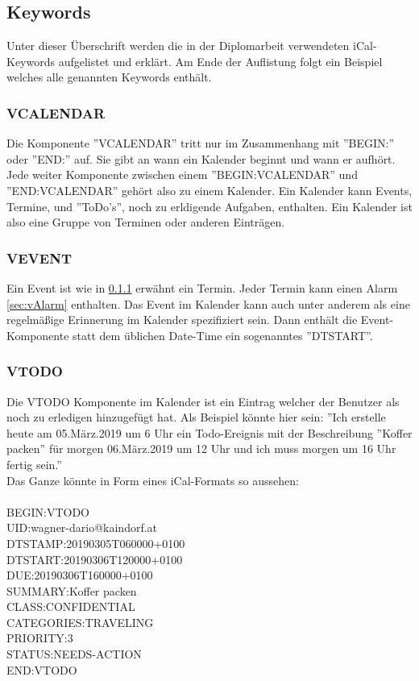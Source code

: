 \subsection{Keywords}
\label{sec:keywords}
Unter dieser Überschrift werden die in der Diplomarbeit verwendeten iCal-Keywords aufgelistet und erklärt. Am Ende der Auflistung folgt ein Beispiel welches alle genannten Keywords enthält. 
\subsubsection{VCALENDAR}
\label{sec:vCalendar} 
Die Komponente ''VCALENDAR'' tritt nur im Zusammenhang mit ''BEGIN:'' oder ''END:'' auf. Sie gibt an wann ein Kalender beginnt und wann er aufhört. Jede weiter Komponente zwischen einem ''BEGIN:VCALENDAR'' und ''END:VCALENDAR'' gehört also zu einem Kalender. Ein Kalender kann Events, Termine, und ''ToDo's'', noch zu erldigende Aufgaben, enthalten. Ein Kalender ist also eine Gruppe von Terminen oder anderen Einträgen. 
\subsubsection{VEVENT}
\label{sec:vEvent} 
Ein Event ist wie in \ref{sec:vCalendar} erwähnt ein Termin. Jeder Termin kann einen Alarm \ref{sec:vAlarm} enthalten. Das Event im Kalender kann auch unter anderem als eine regelmäßige Erinnerung im Kalender spezifiziert sein. Dann enthält die Event-Komponente statt dem üblichen Date-Time ein sogenanntes ''DTSTART''.
\subsubsection{VTODO}
\label{sec:vTodo} 
Die VTODO Komponente im Kalender ist ein Eintrag welcher der Benutzer als noch zu erledigen hinzugefügt hat. Als Beispiel könnte hier sein: ''Ich erstelle heute am 05.März.2019 um 6 Uhr ein Todo-Ereignis mit der Beschreibung ''Koffer packen'' für morgen 06.März.2019 um 12 Uhr und ich muss morgen um 16 Uhr fertig sein.'' \\
Das Ganze könnte in Form eines iCal-Formats so aussehen: \\ \\
  BEGIN:VTODO \\
  UID:wagner-dario@kaindorf.at\\
  DTSTAMP:20190305T060000+0100\\
  DTSTART:20190306T120000+0100\\
  DUE:20190306T160000+0100\\
  SUMMARY:Koffer packen\\
  CLASS:CONFIDENTIAL\\
  CATEGORIES:TRAVELING\\
  PRIORITY:3\\
  STATUS:NEEDS-ACTION\\
  END:VTODO\\
  

